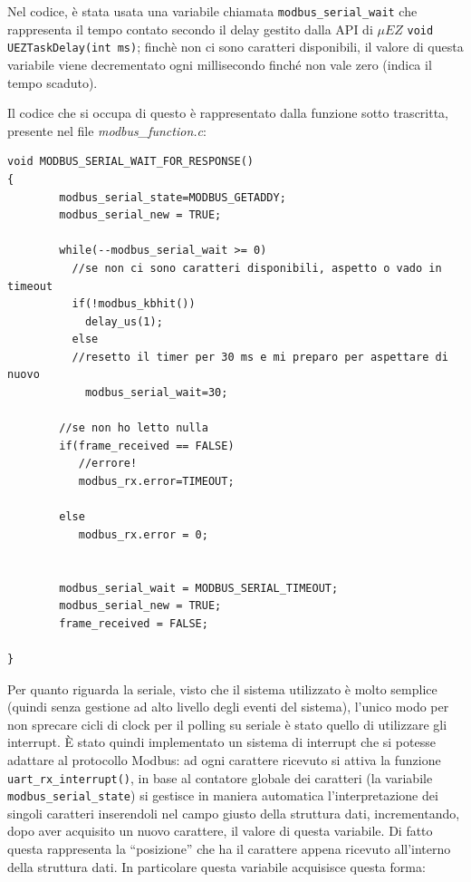 \documentclass[a4paper,titlepage]{book}
\begin{document}
Nel codice, è stata usata una variabile chiamata \lstinline!modbus_serial_wait! che rappresenta il tempo contato secondo il delay gestito dalla API di $\mu EZ$ \lstinline!void UEZTaskDelay(int ms)!; finchè non ci sono caratteri disponibili, il valore di questa variabile viene decrementato ogni millisecondo finché non vale zero (indica il tempo scaduto).

Il codice che si occupa di questo è rappresentato dalla funzione sotto trascritta, presente nel file \textit{modbus\_function.c}:

\begin{lstlisting}[showlines=true,firstline=1, firstnumber=110]
void MODBUS_SERIAL_WAIT_FOR_RESPONSE()
{
        modbus_serial_state=MODBUS_GETADDY;
        modbus_serial_new = TRUE;

        while(--modbus_serial_wait >= 0)
          //se non ci sono caratteri disponibili, aspetto o vado in timeout
          if(!modbus_kbhit())
            delay_us(1);
          else
          //resetto il timer per 30 ms e mi preparo per aspettare di nuovo
            modbus_serial_wait=30;

        //se non ho letto nulla
        if(frame_received == FALSE)
           //errore!
           modbus_rx.error=TIMEOUT;

        else
           modbus_rx.error = 0;


        modbus_serial_wait = MODBUS_SERIAL_TIMEOUT;
        modbus_serial_new = TRUE;
        frame_received = FALSE;

}
\end{lstlisting}

\newpage
Per quanto riguarda la seriale, visto che il sistema utilizzato è molto semplice (quindi senza gestione ad alto livello degli eventi del sistema), l'unico modo per non sprecare cicli di clock per il polling su seriale è stato quello di utilizzare gli interrupt. È stato quindi implementato un sistema di interrupt che si potesse adattare al protocollo Modbus: ad ogni carattere ricevuto si attiva la funzione \lstinline!uart_rx_interrupt()!,  in base al contatore globale dei caratteri (la variabile \lstinline!modbus_serial_state!) si gestisce in maniera automatica l'interpretazione dei singoli caratteri inserendoli nel campo giusto della struttura dati, incrementando, dopo aver acquisito un nuovo carattere, il valore di questa variabile. Di fatto questa rappresenta la ``posizione'' che ha il carattere appena ricevuto all'interno della struttura dati.
In particolare questa variabile acquisisce questa forma:
\end{document}
